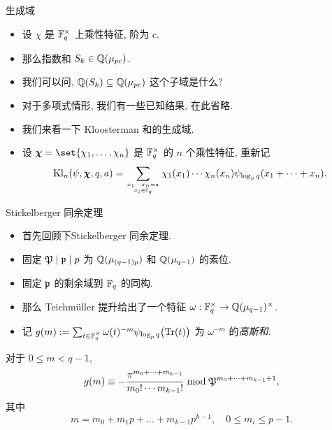 \documentclass[aspectratio=169,handout]{ctexbeamer}
\newcommand\bchi{{\boldsymbol\chi}}
\begin{document}
\begin{frame}{生成域}
	\begin{itemize}
		\item 设 $\chi$ 是 ${\mathbb{F}}_q^\times$ 上乘性特征, 阶为 $c$.
		\item 那么指数和 $S_k\in{\mathbb{Q}}(\mu_{pc})$.
		\item 我们可以问, ${\mathbb{Q}}(S_k)\subseteq {\mathbb{Q}}(\mu_{pc})$ 这个子域是什么?
		\item 对于多项式情形, 我们有一些已知结果, 在此省略.
		\item 我们来看一下 Kloosterman 和的生成域.
		\item 设 $\bchi=\set{\chi_1,\dots,\chi_n}$ 是 ${\mathbb{F}}_q^\times$ 的 $n$ 个乘性特征, 重新记
		\[
			\Kl_n(\psi,\bchi,q,a)=\sum_{x_1\cdots x_n=a\atop x_i\in\BF_{q}}\chi_1(x_1)\cdots\chi_n(x_n)\psi_{\log_p q}(x_1+\cdots+x_n).
		\]
	\end{itemize}
\end{frame}


\begin{frame}{Stickelberger 同余定理}
	\begin{itemize}
		\item 首先回顾下Stickelberger 同余定理.
		\item 固定 ${\mathfrak{P}}\mid {\mathfrak{p}} \mid p$ 为 ${\mathbb{Q}}(\mu_{(q-1)p})$ 和 ${\mathbb{Q}}(\mu_{q-1})$ 的素位.
		\item 固定 ${\mathfrak{p}}$ 的剩余域到 ${\mathbb{F}}_q$ 的同构.
		\item 那么 Teichm\"uller 提升给出了一个特征 $\omega:{\mathbb{F}}_q^\times\to{\mathbb{Q}}(\mu_{q-1})^\times$.
		\item 记 $g(m):=\sum_{t\in{\mathbb{F}}_q^\times}\omega(t)^{-m}\psi_{\log_p q}\bigl({\mathrm{Tr}}(t)\bigr)$ 为 $\omega^{-m}$ 的\emph{高斯和}.
	\end{itemize}
	\onslide<+->
	\begin{theorem}
		对于 $0\le m<q-1$,
		\[
			g(m)\equiv -\frac{\pi^{m_0+\dots +m_{k-1}}}{m_0!\cdots m_{k-1}!} \bmod {\mathfrak{P}}^{m_0+\dots+m_{k-1}+1},
		\]
		其中
		\[
			m=m_0+m_1p+\dots+m_{k-1}p^{k-1},\quad
			0\le m_i\le p-1.
		\]
	\end{theorem}
\end{frame}
\end{document}
